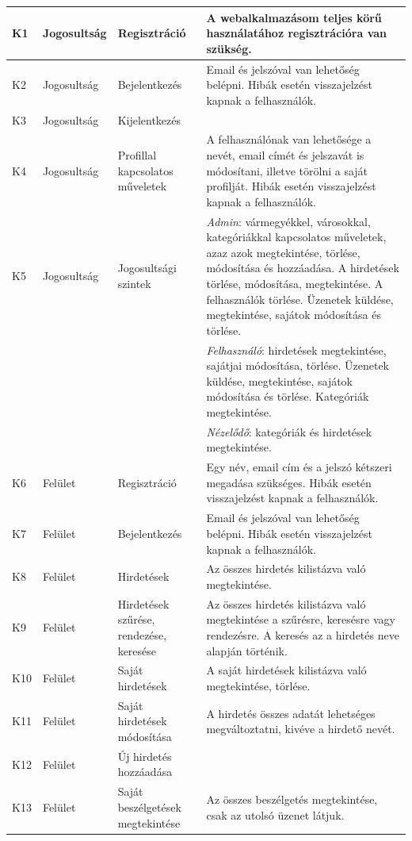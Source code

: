 \documentclass[]{thesis-ekf}
\theoremstyle{definition}
\theoremstyle{remark}
\begin{document}
\begin{longtable}{|l|l|p{3cm}|p{8cm}|}
			K1 & Jogosultság & Regisztráció & A webalkalmazásom teljes körű használatához regisztrációra van szükség. \\ \hline
			K2 & Jogosultság & Bejelentkezés & Email és jelszóval van lehetőség belépni. Hibák esetén visszajelzést kapnak a felhasználók. \\ \hline
			K3 & Jogosultság & Kijelentkezés & \\ \hline
			K4 & Jogosultság & Profillal kapcsolatos műveletek & A felhasználónak van lehetősége a nevét, email címét és jelszavát is módosítani, illetve törölni a saját profilját. Hibák esetén visszajelzést kapnak a felhasználók. \\ \hline
			K5 & Jogosultság & Jogosultsági szintek & \emph{Admin}: vármegyékkel, városokkal, kategóriákkal kapcsolatos műveletek, azaz azok megtekintése, törlése, módosítása és hozzáadása. A hirdetések törlése, módosítása, megtekintése. A felhasználók törlése. Üzenetek küldése, megtekintése, sajátok módosítása és törlése. \\ 
			& & & \emph{Felhasználó}: hirdetések megtekintése, sajátjai módosítása, törlése. Üzenetek küldése, megtekintése, sajátok módosítása és törlése. Kategóriák megtekintése. \\ 
			& & & \emph{Nézelődő}: kategóriák és hirdetések megtekintése. \\ \hline
			K6 & Felület & Regisztráció & Egy név, email cím és a jelszó kétszeri megadása szükséges. Hibák esetén visszajelzést kapnak a felhasználók. \\ \hline
			K7 & Felület & Bejelentkezés & Email és jelszóval van lehetőség belépni. Hibák esetén visszajelzést kapnak a felhasználók. \\ \hline
			K8 & Felület & Hirdetések & Az összes hirdetés kilistázva való megtekintése. \\ \hline
			K9 & Felület & Hirdetések szűrése, rendezése, keresése & Az összes hirdetés kilistázva való megtekintése a szűrésre, keresésre vagy rendezésre. A keresés az a hirdetés neve alapján történik. \\ \hline
			K10 & Felület & Saját hirdetések & A saját hirdetések kilistázva való megtekintése, törlése. \\ \hline
			K11 & Felület & Saját hirdetések módosítása & A hirdetés összes adatát lehetséges megváltoztatni, kivéve a hirdető nevét. \\ \hline
			K12 & Felület & Új hirdetés hozzáadása & ~ \\ \hline
			K13 & Felület & Saját beszélgetések megtekintése & Az összes beszélgetés megtekintése, csak az utolsó üzenet látjuk. \\ \hline

\end{longtable}
\end{document}
